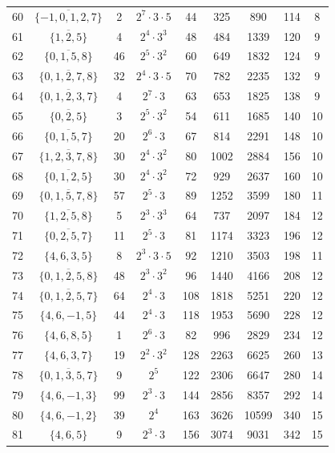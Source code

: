 \documentclass[a4paper,11pt]{article}
\begin{document}
\begin{table}
\begin{center}
{\begin{tabular}{|c|c|c|c|c|c|c|c|c|}
60 & $\overline{\{-1,0,1,2,7\}}$ & 2 & $2^{7} \cdot 3 \cdot 5$ & 44 & 325 & 890 & 114 & 8\\
61 & $\overline{\{1,2,5\}}$ & 4 & $2^{4} \cdot 3^{3}$ & 48 & 484 & 1339 & 120 & 9\\
62 & $\overline{\{0,1,5,8\}}$ & 46 & $2^{5} \cdot 3^{2}$ & 60 & 649 & 1832 & 124 & 9\\
63 & $\overline{\{0,1,2,7,8\}}$ & 32 & $2^{4} \cdot 3 \cdot 5$ & 70 & 782 & 2235 & 132 & 9\\
64 & $\overline{\{0,1,2,3,7\}}$ & 4 & $2^{7} \cdot 3$ & 63 & 653 & 1825 & 138 & 9\\
65 & $\overline{\{0,2,5\}}$ & 3 & $2^{5} \cdot 3^{2}$ & 54 & 611 & 1685 & 140 & 10\\
66 & $\overline{\{0,1,5,7\}}$ & 20 & $2^{6} \cdot 3$ & 67 & 814 & 2291 & 148 & 10\\
67 & $\overline{\{1,2,3,7,8\}}$ & 30 & $2^{4} \cdot 3^{2}$ & 80 & 1002 & 2884 & 156 & 10\\
68 & $\overline{\{0,1,2,5\}}$ & 30 & $2^{4} \cdot 3^{2}$ & 72 & 929 & 2637 & 160 & 10\\
69 & $\overline{\{0,1,5,7,8\}}$ & 57 & $2^{5} \cdot 3$ & 89 & 1252 & 3599 & 180 & 11\\
70 & $\overline{\{1,2,5,8\}}$ & 5 & $2^{3} \cdot 3^{3}$ & 64 & 737 & 2097 & 184 & 12\\
71 & $\overline{\{0,2,5,7\}}$ & 11 & $2^{5} \cdot 3$ & 81 & 1174 & 3323 & 196 & 12\\
72 & $\{4,6,3,5\}$ & 8 & $2^{3} \cdot 3 \cdot 5$ & 92 & 1210 & 3503 & 198 & 11\\
73 & $\overline{\{0,1,2,5,8\}}$ & 48 & $2^{3} \cdot 3^{2}$ & 96 & 1440 & 4166 & 208 & 12\\
74 & $\overline{\{0,1,2,5,7\}}$ & 64 & $2^{4} \cdot 3$ & 108 & 1818 & 5251 & 220 & 12\\
75 & $\{4,6,-1,5\}$ & 44 & $2^{4} \cdot 3$ & 118 & 1953 & 5690 & 228 & 12\\
76 & $\{4,6,8,5\}$ & 1 & $2^{6} \cdot 3$ & 82 & 996 & 2829 & 234 & 12\\
77 & $\{4,6,3,7\}$ & 19 & $2^{2} \cdot 3^{2}$ & 128 & 2263 & 6625 & 260 & 13\\
78 & $\overline{\{0,1,3,5,7\}}$ & 9 & $2^{5}$ & 122 & 2306 & 6647 & 280 & 14\\
79 & $\{4,6,-1,3\}$ & 99 & $2^{3} \cdot 3$ & 144 & 2856 & 8357 & 292 & 14\\
80 & $\{4,6,-1,2\}$ & 39 & $2^{4}$ & 163 & 3626 & 10599 & 340 & 15\\
81 & $\{4,6,5\}$ & 9 & $2^{3} \cdot 3$ & 156 & 3074 & 9031 & 342 & 15\\

\end{tabular}}
\end{center}
\end{table}
\end{document}
